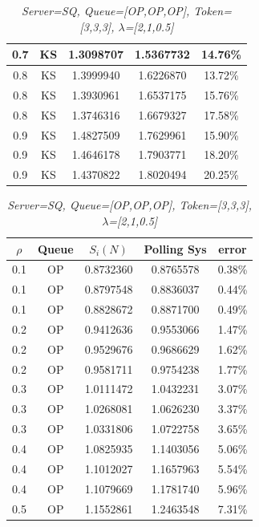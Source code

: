 \documentclass[12pt,a4paper,italian]{article}
\begin{document}
\begin{table}[ht!]
\begin{minipage}[b]{0.48\linewidth}
\begin{tabular}{c c c c c}
		 0.7 & KS & 1.3098707 &   1.5367732    & 14.76\% \\ \hline \hline
		 0.8 & KS & 1.3999940 &   1.6226870    & 13.72\% \\
		 0.8 & KS & 1.3930961 &   1.6537175    & 15.76\% \\
		 0.8 & KS & 1.3746316 &   1.6679327    & 17.58\% \\ \hline \hline
		 0.9 & KS & 1.4827509 &   1.7629961    & 15.90\% \\
		 0.9 & KS & 1.4646178 &   1.7903771    & 18.20\% \\
		 0.9 & KS & 1.4370822 &   1.8020494    & 20.25\% \\ \hline
		
			
		\end{tabular}
	\end{minipage}
	\hspace{0.5cm}
	\begin{minipage}[b]{0.48\linewidth}
		\centering
		\caption{\scriptsize \emph{Server=SQ, Queue=[OP,OP,OP], Token=[3,3,3], $\lambda$=[2,1,0.5]}}
		\label{tab4}
		\tiny
		\begin{tabular}{c c c c c}
			\hline
			$\rho$ & Queue & $S_i(N)$ & Polling Sys & error \\ \hline
			 0.1 &  OP &  0.8732360 &    0.8765578    &  0.38\% \\	 
			 0.1 &  OP &  0.8797548 &    0.8836037    &  0.44\% \\	 
			 0.1 &  OP &  0.8828672 &    0.8871700    &  0.49\% \\ \hline \hline
			 0.2 &  OP &  0.9412636 &    0.9553066    &  1.47\% \\	 
			 0.2 &  OP &  0.9529676 &    0.9686629    &  1.62\% \\	 
			 0.2 &  OP &  0.9581711 &    0.9754238    &  1.77\% \\	  \hline \hline
			 0.3 &  OP &  1.0111472 &    1.0432231    &  3.07\% \\	 
			 0.3 &  OP &  1.0268081 &    1.0626230    &  3.37\% \\	 
			 0.3 &  OP &  1.0331806 &    1.0722758    &  3.65\% \\	 \hline \hline 
			 0.4 &  OP &  1.0825935 &    1.1403056    &  5.06\% \\	 
			 0.4 &  OP &  1.1012027 &    1.1657963    &  5.54\% \\	 
			 0.4 &  OP &  1.1079669 &    1.1781740    &  5.96\% \\	 	 \hline \hline 
			 0.5 &  OP &  1.1552861 &    1.2463548    &  7.31\% \\	 

\end{tabular}
\end{minipage}
\end{table}
\end{document}
